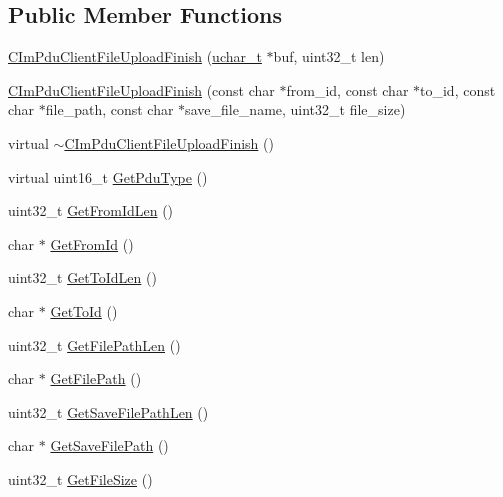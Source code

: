 \subsection*{Public Member Functions}
\begin{DoxyCompactItemize}
\item 
\hyperlink{class_c_im_pdu_client_file_upload_finish_abf2f43d2f6a3c4368aaffbc803ac65c5}{C\+Im\+Pdu\+Client\+File\+Upload\+Finish} (\hyperlink{base_2ostype_8h_a124ea0f8f4a23a0a286b5582137f0b8d}{uchar\+\_\+t} $\ast$buf, uint32\+\_\+t len)
\item 
\hyperlink{class_c_im_pdu_client_file_upload_finish_aeaf5eb12a49b3a9e3e50a89a21c4c5e7}{C\+Im\+Pdu\+Client\+File\+Upload\+Finish} (const char $\ast$from\+\_\+id, const char $\ast$to\+\_\+id, const char $\ast$file\+\_\+path, const char $\ast$save\+\_\+file\+\_\+name, uint32\+\_\+t file\+\_\+size)
\item 
virtual \hyperlink{class_c_im_pdu_client_file_upload_finish_a3ac55dcdf73024339793ae753fd05933}{$\sim$\+C\+Im\+Pdu\+Client\+File\+Upload\+Finish} ()
\item 
virtual uint16\+\_\+t \hyperlink{class_c_im_pdu_client_file_upload_finish_a2d805ed1ececb41a3662c2c16aa8cff6}{Get\+Pdu\+Type} ()
\item 
uint32\+\_\+t \hyperlink{class_c_im_pdu_client_file_upload_finish_a1504193176ec74eba0e5b9315dd8e841}{Get\+From\+Id\+Len} ()
\item 
char $\ast$ \hyperlink{class_c_im_pdu_client_file_upload_finish_a6819acea514ac4349897ecaed9af1488}{Get\+From\+Id} ()
\item 
uint32\+\_\+t \hyperlink{class_c_im_pdu_client_file_upload_finish_a7e7f341a9831f7d16066f93dd8911e49}{Get\+To\+Id\+Len} ()
\item 
char $\ast$ \hyperlink{class_c_im_pdu_client_file_upload_finish_a3be96608cb60c66f13b5b74750e273cb}{Get\+To\+Id} ()
\item 
uint32\+\_\+t \hyperlink{class_c_im_pdu_client_file_upload_finish_af583b166c546765a6ea25643d7f6821d}{Get\+File\+Path\+Len} ()
\item 
char $\ast$ \hyperlink{class_c_im_pdu_client_file_upload_finish_ab4041a09f1cd860dcbd8942279675a35}{Get\+File\+Path} ()
\item 
uint32\+\_\+t \hyperlink{class_c_im_pdu_client_file_upload_finish_ac8f16d838fd75ee3dfd615e11a0ae8ba}{Get\+Save\+File\+Path\+Len} ()
\item 
char $\ast$ \hyperlink{class_c_im_pdu_client_file_upload_finish_aee59e8cfe6e7d1446186aa73218f4cad}{Get\+Save\+File\+Path} ()
\item 
uint32\+\_\+t \hyperlink{class_c_im_pdu_client_file_upload_finish_abb11b722105ded2a68f76867e2d64b51}{Get\+File\+Size} ()
\end{DoxyCompactItemize}
